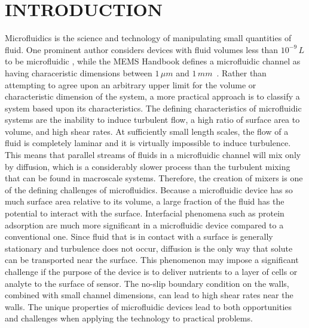 
\chapter{INTRODUCTION}

Microfluidics is the science and technology of manipulating small
quantities of fluid. One prominent author considers devices with fluid
volumes less than $10^{-9}\, L$ to be microfluidic \cite{Whitesides2006},
while the MEMS Handbook defines a microfluidic channel as having characeristic
dimensions between $1\,\mu m$ and $1\, mm$~\cite{Sharp2002}. Rather
than attempting to agree upon an arbitrary upper limit for the volume
or characteristic dimension of the system, a more practical approach
is to classify a system based upon its characteristics. The defining
characteristics of microfluidic systems are the inability to induce
turbulent flow, a high ratio of surface area to volume, and high shear
rates. At sufficiently small length scales, the flow of a fluid is
completely laminar and it is virtually impossible to induce turbulence.
This means that parallel streams of fluids in a microfluidic channel
will mix only by diffusion, which is a considerably slower process
than the turbulent mixing that can be found in macroscale systems.
Therefore, the creation of mixers is one of the defining challenges
of microfluidics. Because a microfluidic device has so much surface
area relative to its volume, a large fraction of the fluid has the
potential to interact with the surface. Interfacial phenomena such
as protein adsorption are much more significant in a microfluidic
device compared to a conventional one. Since fluid that is in contact
with a surface is generally stationary and turbulence does not occur,
diffusion is the only way that solute can be transported near the
surface. This phenomenon may impose a significant challenge if the
purpose of the device is to deliver nutrients to a layer of cells
or analyte to the surface of sensor. The no-slip boundary condition
on the walls, combined with small channel dimensions, can lead to
high shear rates near the walls. The unique properties of microfluidic
devices lead to both opportunities and challenges when applying the
technology to practical problems.

